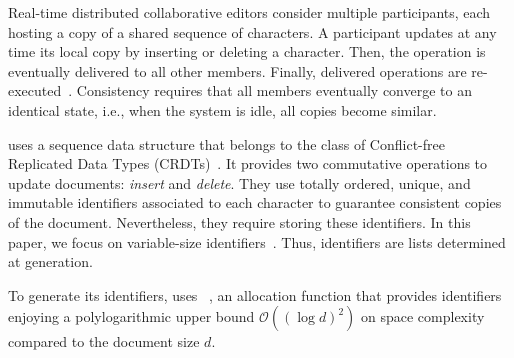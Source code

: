 Real-time distributed collaborative editors consider multiple participants, each
hosting a copy of a shared sequence of characters. A participant updates at any
time its local copy by inserting or deleting a character. Then, the operation is
eventually delivered to all other members. Finally, delivered operations are
re-executed~\cite{saito2005optimistic}. Consistency requires that all members
eventually converge to an identical state, i.e., when the system is idle, all
copies become similar.

\CRATE uses a sequence data structure that belongs to the class of Conflict-free
Replicated Data Types (CRDTs)~\cite{shapiro2011conflict,
  shapiro2011comprehensive}. It provides two commutative operations to update
documents: \emph{insert} and \emph{delete}.  They use totally ordered, unique,
and immutable identifiers associated to each character to guarantee consistent
copies of the document. Nevertheless, they require storing these identifiers. In
this paper, we focus on variable-size identifiers~\cite{preguica2009commutative,
  weiss2009logoot}. Thus, identifiers are lists determined at generation.

To generate its identifiers, \CRATE uses \LSEQ~\cite{nedelec2013lseq}, an
allocation function that provides identifiers enjoying a polylogarithmic upper
bound $\mathcal{O}((\log d)^2)$ on space complexity compared to the document
size $d$. 




